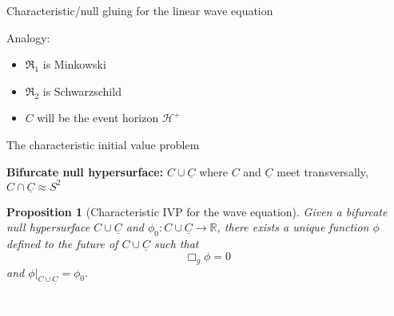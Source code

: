 \documentclass[compress,usenames,dvipsnames,8pt]{beamer}
\newtheorem*{prop}{Proposition}
\theoremstyle{definition}
\renewcommand{\(}{\begin{columns}}
\renewcommand{\)}{\end{columns}}
\newcommand{\<}[1]{\begin{column}{#1}}
\renewcommand{\>}{\end{column}}
\begin{document}
\begin{frame}{Characteristic/null gluing for the linear wave equation}


\begin{figure}
 \def\svgwidth{10pc}

\end{figure}

\pause
Analogy:
\begin{itemize}
\item $\mathfrak R_1$ is Minkowski
\item $\mathfrak R_2$ is Schwarzschild
\item $C$ will be the event horizon $\mathcal H^+$
\end{itemize}

\end{frame}

\begin{frame}{The characteristic initial value problem}

\textbf{Bifurcate null hypersurface:} $C\cup\underline C$ where $C$ and $\underline C$ meet transversally, $C\cap \underline C \approx S^2$ \pause
\begin{prop}[Characteristic IVP for the wave equation]
Given a bifurcate null hypersurface $C\cup\underline C$ and $\phi_0:C\cup \underline C\to\mathbb R$, there exists a unique function $\phi$ defined to the future of $C\cup \underline C$ such that 
\[\Box_g \phi =0 \tag{$*$}\]
and $\phi|_{C\cup \underline C}= \phi_0$. 
\end{prop}

\pause

\begin{figure}
 \def\svgwidth{10pc}

\end{figure}



\begin{center}
\textcolor{white}{\underline{Characteristic data for the wave equation does not involve derivatives.}}
\end{center}
\end{frame}
\end{document}
